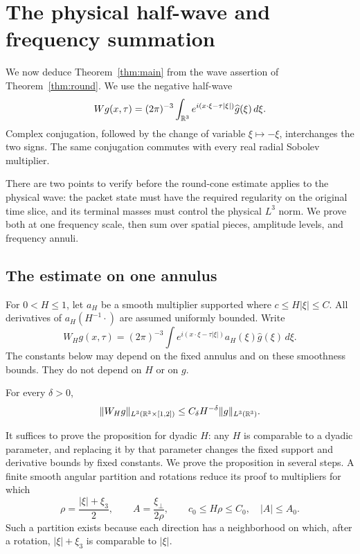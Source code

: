 \section{The physical half-wave and frequency summation}
\label{sec:phys}

We now deduce Theorem~\ref{thm:main} from the wave assertion of
Theorem~\ref{thm:round}.  We use the negative half-wave
\[
 Wg(x,\tau)=(2\pi)^{-3}\int_{\mathbb R^3}
 e^{i(x\cdot\xi-\tau|\xi|)}\widehat g(\xi)\,d\xi.
\]
Complex conjugation, followed by the change of variable $\xi\mapsto-\xi$,
interchanges the two signs.  The same conjugation commutes with every
real radial Sobolev multiplier.

There are two points to verify before the round-cone estimate applies to
the physical wave: the packet state must have the required regularity on
the original time slice, and its terminal masses must control the physical
$L^3$ norm. We prove both at one frequency scale, then sum over spatial
pieces, amplitude levels, and frequency annuli.

\subsection{The estimate on one annulus}

For $0<H\le1$, let $a_H$ be a smooth multiplier supported where
$c\le H|\xi|\le C$.  All derivatives of $a_H(H^{-1}\cdot)$ are assumed
uniformly bounded.  Write
\begin{equation}
 W_Hg(x,\tau)=(2\pi)^{-3}\int
 e^{i(x\cdot\xi-\tau|\xi|)}a_H(\xi)\widehat g(\xi)\,d\xi.
 \label{eq:phys-annular-wave}
\end{equation}
The constants below may depend on the fixed annulus and on these
smoothness bounds.  They do not depend on $H$ or on $g$.

\begin{proposition}
\label{prop:phys-annular}
For every $\delta>0$,
\begin{equation}
 \lVert W_Hg\rVert_{L^3(\mathbb R^3\times[1,2])}
 \le C_\delta H^{-\delta}\lVert g\rVert_{L^3(\mathbb R^3)}.
 \label{eq:phys-annular-estimate}
\end{equation}
\end{proposition}

It suffices to prove the proposition for dyadic $H$: any $H$ is
comparable to a dyadic parameter, and replacing it by that parameter
changes the fixed support and derivative bounds by fixed constants.
We prove the proposition in several steps.  A finite smooth angular
partition and rotations reduce its proof to multipliers for which
\begin{equation}
 \rho=\frac{|\xi|+\xi_3}{2},\qquad
 A=\frac{\xi_\perp}{2\rho},\qquad
 c_0\le H\rho\le C_0,\quad |A|\le A_0.
 \label{eq:phys-patch}
\end{equation}
Such a partition exists because each direction has a neighborhood on
which, after a rotation, $|\xi|+\xi_3$ is comparable to $|\xi|$.

